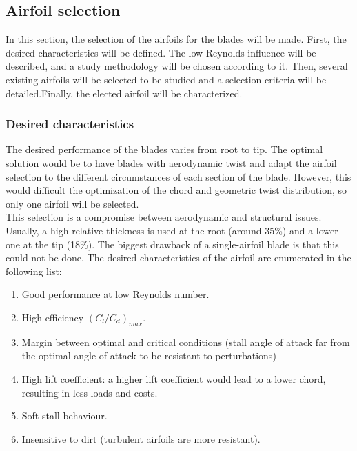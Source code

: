 \documentclass[../TFG_Report.tex]{subfiles}
\begin{document}
\subsection{Airfoil selection}

In this section, the selection of the airfoils for the blades will be made. First, the desired characteristics will be defined. The low Reynolds influence will be described, and a study methodology will be chosen according to it. Then, several existing airfoils will be selected to be studied and a selection criteria will be detailed.Finally, the elected airfoil will be characterized. 


\subsubsection{Desired characteristics}

The desired performance of the blades varies from root to tip. The optimal solution would be to have blades with aerodynamic twist and adapt the airfoil selection to the different circumstances of each section of the blade. However, this would difficult the optimization of the chord and geometric twist distribution, so only one airfoil will be selected. \\

This selection is a compromise between aerodynamic and structural issues. Usually, a high relative thickness is used at the root (around 35\%) and a lower one at the tip (18\%). The biggest drawback of a single-airfoil blade is that this could not be done. The desired characteristics of the airfoil are enumerated in the following list: \cite{Apunts} \cite{Wood}


\begin{enumerate}
	\item Good performance at low Reynolds number. 
	\item High efficiency $(C_l/C_d)_{max}$.
	\item Margin between optimal and critical conditions (stall angle of attack far from the optimal angle of attack to be resistant to perturbations)
	\item High lift coefficient: a higher lift coefficient would lead to a lower chord, resulting in less loads and costs.  
	\item Soft stall behaviour.
	\item Insensitive to dirt (turbulent airfoils are more resistant). 
\end{enumerate}
\end{document}
